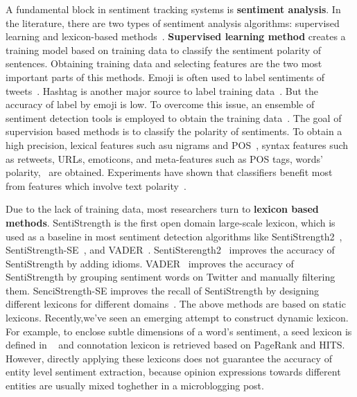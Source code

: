 \documentclass[runningheads]{llncs}
\begin{document}
A fundamental block in sentiment tracking systems is \textbf{sentiment analysis}. In the literature, there are two types of sentiment analysis algorithms: supervised learning and lexicon-based methods~\cite{Ahmed2017SentiCR}. \textbf{Supervised learning method} creates a training model based on training data
to classify the sentiment polarity of sentences. Obtaining training data and selecting features are the two most important parts of this methods. 
Emoji is often used to label sentiments of tweets~\cite{Go2009Supervisedlearning,Pak2010Supervisedlearning}. Hashtag is another major source to label training data~\cite{Papadopoulos2012SocialEvent}.
But the accuracy of label by emoji is low. To overcome this issue, an ensemble of sentiment detection tools is employed to obtain the training data~\cite{Barbosa2010Supervisedlearning}. 
The goal of supervision based methods is to classify the polarity of sentiments. To obtain a high precision, lexical features such asu nigrams and POS~\cite{Go2009Supervisedlearning,Davidov2010Supervisedlearning}, syntax features  such as  retweets, URLs, emoticons, and meta-features such as  POS tags, words’ polarity,~\cite{Barbosa2010Supervisedlearning} are obtained.
Experiments have shown that classifiers benefit most from features which involve text polarity~\cite{Agarwal2010Supervisedlearning}.

Due to the lack of training data, most researchers turn to \textbf{lexicon based methods}. 
SentiStrength is the first open domain large-scale lexicon, which is used as a baseline in most sentiment detection algorithms like SentiStrength2~\cite{Thelwall2012lexicon}, SentiStrength-SE~\cite{Rakibul2017SentiStrength-SE}, and VADER~\cite{Hutto2014SSimproved}. 
SentiSterength2~\cite{Thelwall2012lexicon} improves the accuracy of SentiStrength by adding idioms. 
VADER~\cite{Hutto2014SSimproved} improves the accuracy of SentiStrength by grouping sentiment words on Twitter and manually filtering them. 
SenciStrength-SE improves the recall of SentiStrength by designing different lexicons for different domains~\cite{Rakibul2017SentiStrength-SE}. 
The above methods are based on static lexicons.
Recently,we've seen an emerging attempt to construct dynamic lexicon. 
For example, to enclose subtle dimensions of a word’s sentiment, a seed lexicon is defined in ~\cite{Feng2011lexicon} and connotation lexicon is retrieved based on PageRank and HITS. 
However, directly applying these lexicons does not guarantee the accuracy of entity level sentiment extraction, because opinion expressions towards different entities are usually mixed toghether in a microblogging post. 
\end{document}
